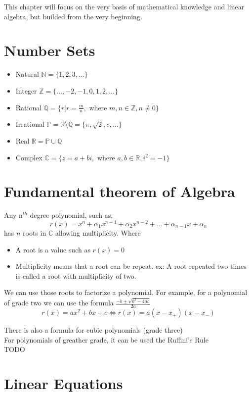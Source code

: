 This chapter will focus on the very basis of mathematical knowledge and linear algebra, but builded from the very beginning.

\section{Number Sets}
\begin{itemize}
    \item Natural $\mathbb{N} = \{1, 2, 3, \dots\}$
    \item Integer $\mathbb{Z} = \{\dots, -2, -1, 0, 1, 2, \dots\}$
    \item Rational $\mathbb{Q} = \{r | r= \frac{m}{n},$ where $m,n \in \mathbb{Z}, n \neq 0\}$
    \item Irrational $\mathbb{P} = \mathbb{R} \setminus \mathbb{Q} = \{\pi, \sqrt{2}, e, \dots \}$
    \item Real $\mathbb{R} = \mathbb{P} \cup \mathbb{Q}$
    \item Complex $\mathbb{C} = \{ z = a +bi, $ where $a,b\in \mathbb{R}, i^2=-1\}$
\end{itemize}

\section{Fundamental theorem of Algebra}
Any n$^{th}$ degree polynomial, such as,
\[ r(x) = x^n + \alpha_1 x^{n-1} + \alpha_2 x^{n-2} + \dots + \alpha_{n-1}x + \alpha_n \]
has $n$ roots in $\mathbb{C}$ allowing multiplicity. Where
\begin{itemize}
    \item A root is a value such as $r(x)=0$
    \item Multiplicity means that a root can be repeat. ex: A root repeated two times is called a root with multiplicity of two.
\end{itemize} 

We can use those roots to factorize a polynomial. For example, for a polynomial of grade two we can use the formula
$\frac{-b \pm \sqrt{b^2 - 4ac}}{2a}$
\[ r(x) = ax^2 + bx + c \Leftrightarrow r(x) = a(x-x_+)(x-x_-) \]

There is also a formula for cubic polynomials (grade three)\\

For polynomials of greather grade, it can be used the Ruffini's Rule\\
TODO

\section{Linear Equations}
